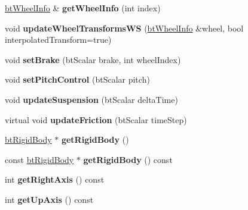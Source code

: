 \begin{DoxyCompactItemize}
\item 
\mbox{\label{classbtRaycastVehicle_a59f388ee6ccf61c43b6b19d27d3a4b9f}} 
\hyperlink{structbtWheelInfo}{bt\+Wheel\+Info} \& {\bfseries get\+Wheel\+Info} (int index)
\item 
\mbox{\label{classbtRaycastVehicle_a097dff14b09869992c4c2ced984305b3}} 
void {\bfseries update\+Wheel\+Transforms\+WS} (\hyperlink{structbtWheelInfo}{bt\+Wheel\+Info} \&wheel, bool interpolated\+Transform=true)
\item 
\mbox{\label{classbtRaycastVehicle_a6b9dd519ac59a2bf326f4ff423e4ba6d}} 
void {\bfseries set\+Brake} (bt\+Scalar brake, int wheel\+Index)
\item 
\mbox{\label{classbtRaycastVehicle_ab37ab7f7f32f8d62222061fd114aa822}} 
void {\bfseries set\+Pitch\+Control} (bt\+Scalar pitch)
\item 
\mbox{\label{classbtRaycastVehicle_a6be582b77af41d8ad50369d30882776d}} 
void {\bfseries update\+Suspension} (bt\+Scalar delta\+Time)
\item 
\mbox{\label{classbtRaycastVehicle_a074131752aafd9bf75b5c05411439de3}} 
virtual void {\bfseries update\+Friction} (bt\+Scalar time\+Step)
\item 
\mbox{\label{classbtRaycastVehicle_af240c382a71932a3efd9a3d88895375c}} 
\hyperlink{classbtRigidBody}{bt\+Rigid\+Body} $\ast$ {\bfseries get\+Rigid\+Body} ()
\item 
\mbox{\label{classbtRaycastVehicle_a780e7abcff029bee48bf888327b0a856}} 
const \hyperlink{classbtRigidBody}{bt\+Rigid\+Body} $\ast$ {\bfseries get\+Rigid\+Body} () const
\item 
\mbox{\label{classbtRaycastVehicle_a8900579eb259c892f9866564560494e6}} 
int {\bfseries get\+Right\+Axis} () const
\item 
\mbox{\label{classbtRaycastVehicle_a2b25853702eca35f0abbd66275864547}} 
int {\bfseries get\+Up\+Axis} () const

\end{DoxyCompactItemize}
